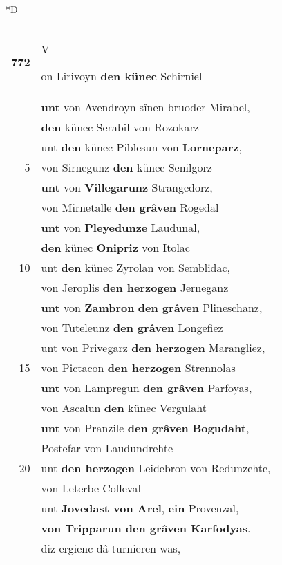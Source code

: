 \documentclass[8pt,a4paper,notitlepage]{article}
\begin{document}
\begin{table}[ht]
\begin{minipage}[t]{0.5\linewidth}
\small
\begin{center}*D
\end{center}
\begin{tabular}{rl}
\textbf{772} & \begin{large}V\end{large}on Lirivoyn \textbf{den künec} Schirniel\\ 
 & \textbf{unt} von Avendroyn sînen bruoder Mirabel,\\ 
 & \textbf{den} künec Serabil von Rozokarz\\ 
 & unt \textbf{den} künec Piblesun von \textbf{Lorneparz},\\ 
5 & von Sirnegunz \textbf{den} künec Senilgorz\\ 
 & \textbf{unt} von \textbf{Villegarunz} Strangedorz,\\ 
 & von Mirnetalle \textbf{den grâven} Rogedal\\ 
 & \textbf{unt} von \textbf{Pleyedunze} Laudunal,\\ 
 & \textbf{den} künec \textbf{Onipriz} von Itolac\\ 
10 & unt \textbf{den} künec Zyrolan von Semblidac,\\ 
 & von Jeroplis \textbf{den herzogen} Jerneganz\\ 
 & \textbf{unt} von \textbf{Zambron} \textbf{den grâven} Plineschanz,\\ 
 & von Tuteleunz \textbf{den grâven} Longefiez\\ 
 & unt von Privegarz \textbf{den herzogen} Marangliez,\\ 
15 & von Pictacon \textbf{den herzogen} Strennolas\\ 
 & \textbf{unt} von Lampregun \textbf{den grâven} Parfoyas,\\ 
 & von Ascalun \textbf{den} künec Vergulaht\\ 
 & \textbf{unt} von Pranzile \textbf{den grâven} \textbf{Bogudaht},\\ 
 & Postefar von Laudundrehte\\ 
20 & unt \textbf{den herzogen} Leidebron von Redunzehte,\\ 
 & von Leterbe Colleval\\ 
 & unt \textbf{Jovedast von Arel}, \textbf{ein} Provenzal,\\ 
 & \textbf{von Tripparun den grâven Karfodyas}.\\ 
 & diz ergienc dâ turnieren was,\\ 

\end{tabular}
\end{minipage}
\end{table}
\end{document}
